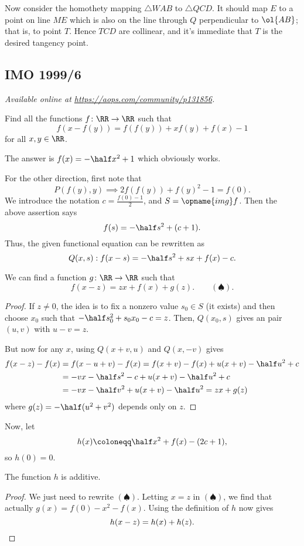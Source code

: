 \documentclass[11pt]{scrartcl}
\begin{document}
Now consider the homothety mapping $\triangle WAB$
to $\triangle QCD$.
It should map $E$ to a point on line $ME$
which is also on the line through $Q$ perpendicular to $\ol{AB}$;
that is, to point $T$.
Hence $TCD$ are collinear,
and it's immediate that $T$ is the desired tangency point.
\pagebreak

\subsection{IMO 1999/6}
\textsl{Available online at \url{https://aops.com/community/p131856}.}
\begin{mdframed}[style=mdpurplebox,frametitle={Problem statement}]
Find all the functions $f \colon \RR \to \RR$ such that
\[f(x-f(y))=f(f(y))+xf(y)+f(x)-1\]
for all $x,y \in \RR$.
\end{mdframed}
The answer is $f(x) = -\half x^2+1$
which obviously works.

For the other direction, first note that
\[ P(f(y),y) \implies 2f(f(y)) + f(y)^2 - 1 = f(0). \]
We introduce the notation $c = \frac{f(0)-1}{2}$,
and $S = \opname{img} f$.
Then the above assertion says
\[ f(s) = -\half s^2 + (c + 1). \]
Thus, the given functional equation can be rewritten as
\[ Q(x,s) : f(x-s)=-\half s^2 + sx + f(x) - c. \]

\begin{claim*}
  We can find a function $g \colon \RR \to \RR$ such that
  \[ f(x-z) = zx + f(x) + g(z). \qquad (\spadesuit). \]
\end{claim*}
\begin{proof}
  If $z \neq 0$,
  the idea is to fix a nonzero value $s_0 \in S$ (it exists)
  and then choose $x_0$ such that $- \half s_0^2 + s_0 x_0 - c = z$.
  Then, $Q(x_0, s)$ gives an pair $(u,v)$ with $u-v = z$.

  But now for any $x$, using $Q(x+v,u)$ and $Q(x,-v)$ gives
  \begin{align*}
    f(x-z)-f(x) &= f(x-u+v)-f(x)
    = f(x+v)-f(x) + u(x+v) - \half u^2 + c \\
    &= -vx-\half s^2-c + u(x+v) - \half u^2 + c \\
    &= -vx-\half v^2 + u(x+v) - \half u^2 = zx + g(z)
  \end{align*}
  where $g(z) = -\half(u^2+v^2)$ depends only on $z$.
\end{proof}

Now, let
\[ h(x) \coloneqq \half x^2 + f(x) - (2c+1), \]
so $h(0) = 0$.
\begin{claim*}
  The function $h$ is additive.
\end{claim*}
\begin{proof}
  We just need to rewrite $(\spadesuit)$.
  Letting $x=z$ in $(\spadesuit)$,
  we find that actually $g(x)=f(0)-x^2-f(x)$.
  Using the definition of $h$ now gives
  \[ h(x-z) = h(x) + h(z). \qedhere \]
\end{proof}
\end{document}
